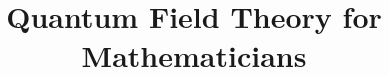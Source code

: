 \documentclass[a4paper, 12pt, oneside]{memoir}
\title{\sffamily\bfseries Quantum Field Theory for Mathematicians}
\author{}
\date{}
\begin{document}
\maketitle
\firmlists








\sloppy
\printbibliography
\end{document}
